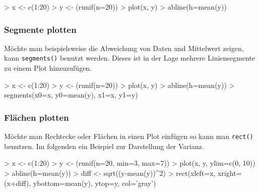 \begin{Schunk}
\begin{Sinput}
> x <- c(1:20)
> y <- (runif(n=20))
> plot(x, y)
> abline(h=mean(y))
\end{Sinput}
\end{Schunk}

\subsubsection{Segmente plotten}
Möchte man beispielsweise die Abweichung von Daten und Mittelwert
zeigen, kann \lstinline{segments()} benutzt werden. Dieses ist in der
Lage mehrere Liniensegmente zu einem Plot hinzuzufügen.

\begin{Schunk}
\begin{Sinput}
> x <- c(1:20)
> y <- (runif(n=20))
> plot(x, y)
> abline(h=mean(y))
> segments(x0=x, y0=mean(y), x1=x, y1=y)
\end{Sinput}
\end{Schunk}

\subsubsection{Flächen plotten}
Möchte man Rechtecke oder Flächen in einen Plot einfügen so kann man 
\lstinline{rect()} benutzen. Im folgenden ein Beispiel zur Darstellung
der Varianz.

\begin{Schunk}
\begin{Sinput}
> x <- c(1:20)
> y <- (runif(n=20, min=3, max=7))
> plot(x, y, ylim=c(0, 10))
> abline(h=mean(y))
> diff <- sqrt((y-mean(y))^2)
> rect(xleft=x, xright=(x+diff), ybottom=mean(y), ytop=y, col='gray')
\end{Sinput}
\end{Schunk}


